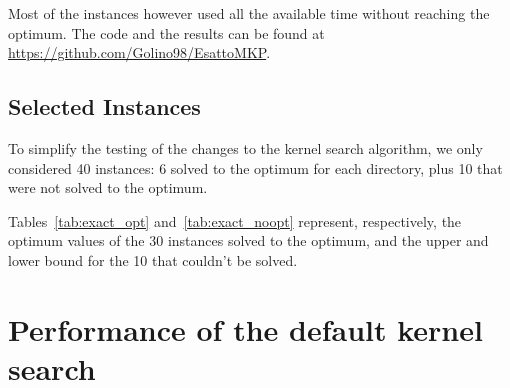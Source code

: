 Most of the instances however used all the available time without reaching the optimum.
The code and the results can be found at \url{https://github.com/Golino98/EsattoMKP}.

\subsection{Selected Instances}\label{subsec:inst}
To simplify the testing of the changes to the kernel search algorithm,
we only considered 40 instances: 6 solved to the optimum for each directory,
plus 10 that were not solved to the optimum.

Tables~\ref{tab:exact_opt} and~\ref{tab:exact_noopt} represent,
respectively, the optimum values of the 30 instances solved to
the optimum, and the upper and lower bound for the 10
that couldn't be solved.





\section{Performance of the default kernel search}

